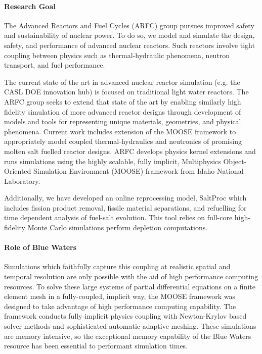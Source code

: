 \documentclass[11pt]{article}
\newcommand{\authorname}{Kathryn~D.~Huff }
\newcommand{\authorsite}{arfc.npre.illinois.edu}
\begin{document}
\pagestyle{fancy}
\lhead{\textcolor{gray}{Investigator: Prof. \authorname\\Presenter: Mr. Andrei Rykhlevskii}}
\rhead{\textcolor{gray}{Advanced Reactors and Fuel Cycles\\}}
\renewcommand{\headrulewidth}{0pt}
\renewcommand{\footrulewidth}{0pt}
\fancyfoot[C]{\footnotesize \textcolor{gray}{\authorsite}}

\paragraph{Research Goal}

The Advanced Reactors and Fuel Cycles (ARFC) group pursues improved safety and
sustainability of nuclear power. To do so, we model and
simulate the design, safety, and performance of advanced nuclear reactors.
Such reactors  involve tight coupling between physics such as thermal-hydraulic
phenomena, neutron transport, and fuel performance.

The current state of the art in advanced nuclear reactor simulation (e.g. the
CASL DOE innovation hub) is focused on traditional light water reactors.
The ARFC group seeks to extend that state of the art by enabling similarly high fidelity simulation of more advanced reactor designs through development of models and tools for representing unique materials, geometries, and physical phenomena. Current work includes extension
of the MOOSE framework to appropriately model coupled thermal-hydraulics and
neutronics of promising molten salt fuelled reactor designs.
ARFC develops physics kernel extensions and runs simulations using the highly
scalable, fully implicit, Multiphysics Object-Oriented Simulation Environment
(MOOSE) framework from Idaho National Laboratory.

Additionally, we have developed 
an online reprocessing model, SaltProc which includes fission product removal, fissile material 
separations, and refuelling for time dependent analysis of fuel-salt evolution. 
This tool relies on full-core high-fidelity Monte Carlo simulations perform depletion 
computations.

\paragraph{Role of Blue Waters}
Simulations which faithfully capture this coupling at realistic spatial and
temporal resolution are only possible with the aid of high performance
computing resources.  
To solve these large systems of partial differential
equations on a finite element mesh in a fully-coupled, implicit way, the MOOSE
framework was designed to take advantage of high performance computing
capability.  The framework conducts fully implicit physics coupling with
Newton-Krylov based solver methods and sophisticated automatic
adaptive meshing.  These simulations are memory intensive, so the exceptional
memory capability of the Blue Waters resource has been essential to performant
simulation times.
\end{document}
